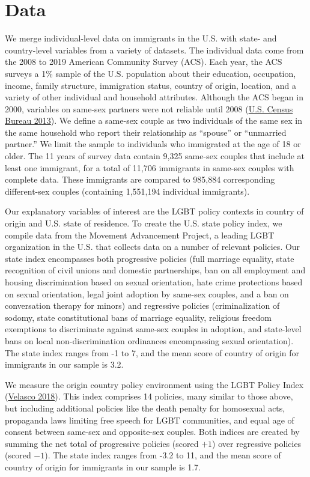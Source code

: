 \documentclass[
  11pt,
]{article}
\begin{document}
\hypertarget{data}{%
\section{Data}\label{data}}

We merge individual-level data on immigrants in the U.S. with state- and country-level variables from a variety of datasets. The individual data come from the 2008 to 2019 American Community Survey (ACS). Each year, the ACS surveys a 1\% sample of the U.S. population about their education, occupation, income, family structure, immigration status, country of origin, location, and a variety of other individual and household attributes. Although the ACS began in 2000, variables on same-sex partners were not reliable until 2008 (\protect\hyperlink{ref-u.s.censusbureau_2013}{U.S. Census Bureau 2013}). We define a same-sex couple as two individuals of the same sex in the same household who report their relationship as ``spouse'' or ``unmarried partner.'' We limit the sample to individuals who immigrated at the age of 18 or older. The 11 years of survey data contain 9,325 same-sex couples that include at least one immigrant, for a total of 11,706 immigrants in same-sex couples with complete data. These immigrants are compared to 985,884 corresponding different-sex couples (containing 1,551,194 individual immigrants).

Our explanatory variables of interest are the LGBT policy contexts in country of origin and U.S. state of residence. To create the U.S. state policy index, we compile data from the Movement Advancement Project, a leading LGBT organization in the U.S. that collects data on a number of relevant policies. Our state index encompasses both progressive policies (full marriage equality, state recognition of civil unions and domestic partnerships, ban on all employment and housing discrimination based on sexual orientation, hate crime protections based on sexual orientation, legal joint adoption by same-sex couples, and a ban on conversation therapy for minors) and regressive policies (criminalization of sodomy, state constitutional bans of marriage equality, religious freedom exemptions to discriminate against same-sex couples in adoption, and state-level bans on local non-discrimination ordinances encompassing sexual orientation). The state index ranges from -1 to 7, and the mean score of country of origin for immigrants in our sample is 3.2.

We measure the origin country policy environment using the LGBT Policy Index (\protect\hyperlink{ref-velasco_2018}{Velasco 2018}). This index comprises 14 policies, many similar to those above, but including additional policies like the death penalty for homosexual acts, propaganda laws limiting free speech for LGBT communities, and equal age of consent between same-sex and opposite-sex couples. Both indices are created by summing the net total of progressive policies (scored \(+1\)) over regressive policies (scored \(-1\)). The state index ranges from -3.2 to 11, and the mean score of country of origin for immigrants in our sample is 1.7.
\end{document}
